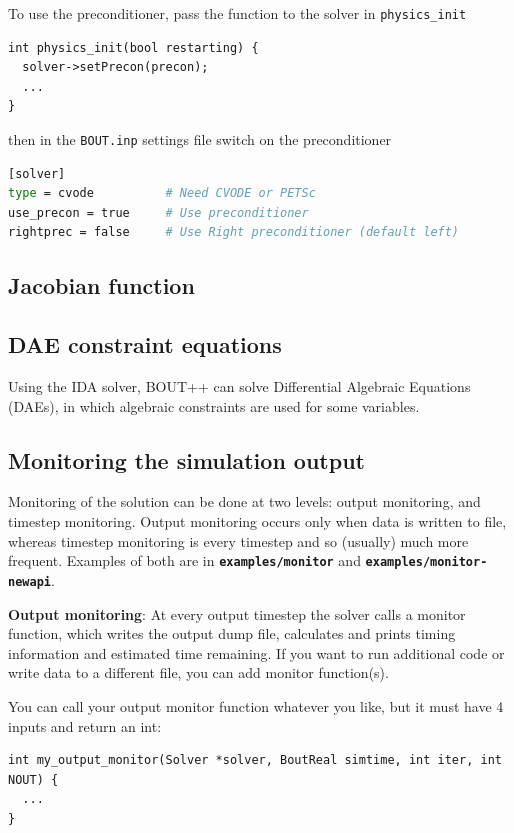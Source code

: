 \documentclass[12pt]{article}
\newcommand{\file}[1]{\texttt{\bf #1}}
\begin{document}
To use the preconditioner, pass the function to the solver in \lstinline!physics_init!
\begin{lstlisting}
int physics_init(bool restarting) {
  solver->setPrecon(precon);
  ...
}
\end{lstlisting}
then in the \texttt{BOUT.inp} settings file switch on the preconditioner
\begin{lstlisting}[language=bash,numbers=none]
[solver]
type = cvode          # Need CVODE or PETSc
use_precon = true     # Use preconditioner
rightprec = false     # Use Right preconditioner (default left)
\end{lstlisting}

\subsection{Jacobian function}



\subsection{DAE constraint equations}

Using the IDA solver, BOUT++ can solve Differential Algebraic Equations (DAEs), in which 
algebraic constraints are used for some variables. 


\subsection{Monitoring the simulation output}

Monitoring of the solution can be done at two levels: output monitoring, and timestep monitoring. Output monitoring
occurs only when data is written to file, whereas timestep monitoring is every timestep and so (usually) much more
frequent. Examples of both are in \file{examples/monitor} and \file{examples/monitor-newapi}.

{\bf Output monitoring}: At every output timestep the solver calls a monitor function, which writes the output dump file,  
calculates and prints timing information and estimated time remaining. If you want to run additional code or write data to a different file, you can add monitor function(s).

You can call your output monitor function whatever you like, but it must have 4 inputs and return an int:
\begin{lstlisting}
int my_output_monitor(Solver *solver, BoutReal simtime, int iter, int NOUT) {
  ...
}
\end{lstlisting}
\end{document}
